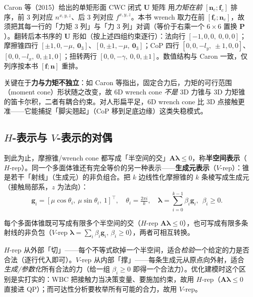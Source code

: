 \begin{note}
Caron 等（2015）给出的单矩形面 CWC 闭式 $\mathbf{U}$ 矩阵\cite{caron2015stability} 用\emph{力矩在前} $[\boldsymbol{n}_c;\boldsymbol{f}_c]$ 排序，前 3 列对应 $n^{x,y,z}$、后 3 列对应 $f^{x,y,z}$。本书 wrench 取力在前 $[\boldsymbol{f}_c;\boldsymbol{n}_c]$，故须把其每一行的「力矩 3 列」与「力 3 列」对调（等价于右乘一个 $6\times6$ 置换 $\mathbf{P}$）。翻转后本书序的 $\mathbf{U}$ 形如（按上述四组约束逐行）：法向行 $[-1,0,0,\ 0,0,0]$；摩擦锥四行 $[\pm1,0,-\mu,\ \mathbf{0}_3]$、$[0,\pm1,-\mu,\ \mathbf{0}_3]$；CoP 四行 $[0,0,-l_y,\ \pm1,0,0]$、$[0,0,-l_x,\ 0,\pm1,0]$；扭转两行 $[0,0,-\gamma,\ 0,0,\pm1]$。数值结构与 Caron 一致，仅列序按本书 $[\boldsymbol{f};\boldsymbol{n}]$ 重排。
\end{note}

\noindent 关键在于\textbf{力与力矩不独立}：如 Caron 等指出，固定合力后，力矩的可行范围（moment cone）形状随之改变，故 6D wrench cone \emph{不是} 3D 力锥与 3D 力矩锥的笛卡尔积，二者有耦合约束。对人形扁平足，6D wrench cone 比 3D 点接触更准——它能捕捉「脚尖翘起」（CoP 移到足底边缘）这类失稳模式。

\subsection{\texorpdfstring{$H$}{H}-表示与 \texorpdfstring{$V$}{V}-表示的对偶}
\label{subsec:hrep-vrep}

到此为止，摩擦锥/wrench cone 都写成「半空间的交」$\mathbf{A}\boldsymbol{\lambda}\le0$，称\textbf{半空间表示}（$H$-rep）。同一个多面体锥还有完全等价的另一种表示——\textbf{生成元表示}（$V$-rep）：锥是若干「射线」（生成元）的非负组合。把 $k$ 边线性化摩擦锥的 $k$ 条棱写成生成元（接触局部系，$z$ 为法向）：
\begin{equation}
  \boldsymbol{g}_i=[\mu\cos\theta_i,\ \mu\sin\theta_i,\ 1]^\top,\quad \theta_i=\tfrac{2\pi i}{k},\quad
  \boldsymbol{\lambda}=\sum_{i=0}^{k-1}\beta_i\boldsymbol{g}_i,\ \ \beta_i\ge0.
  \label{eq:vrep-generators}
\end{equation}

\begin{theorem}
\label{thm:minkowski-weyl}
每个多面体锥既可写成有限多个半空间的交（$H$-rep $\mathbf{A}\boldsymbol{\lambda}\le0$），也可写成有限多条射线的非负包（$V$-rep $\boldsymbol{\lambda}=\sum_i\beta_i\boldsymbol{g}_i,\,\beta_i\ge0$），两者可相互转换。
\end{theorem}

\begin{insight}
$H$-rep 从外部「切」——每个不等式砍掉一个半空间，适合\emph{检验}一个给定的力是否合法（逐行代入即可）。$V$-rep 从内部「撑」——每条生成元从原点向外射，适合\emph{生成/参数化}所有合法的力（给一组 $\beta_i\ge0$ 即得一个合法力）。优化建模时这个区别是实打实的：WBC 把接触力当决策变量、要施加约束，故用 $H$-rep（$\mathbf{A}\boldsymbol{\lambda}\le0$ 直接进 QP）；而可达性分析要枚举所有可能的合力，故用 $V$-rep。
\end{insight}

